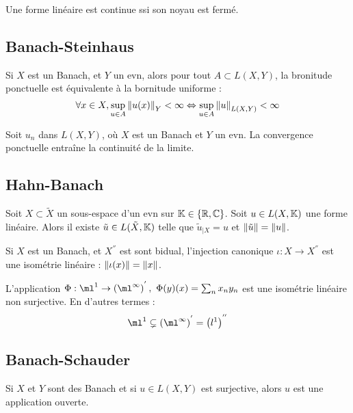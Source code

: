 \documentclass{cours}
\begin{document}
\begin{lemma}
    Une forme linéaire est continue ssi son noyau est fermé.
\end{lemma}

\subsection{Banach-Steinhaus}
\begin{theorem}\label{thm:BanachSteinhaus}
    Si $X$ est un Banach, et $Y$ un evn, alors pour tout $A \subset L(X, Y)$, la bronitude ponctuelle est équivalente à la bornitude uniforme : 
    \[
        \forall x \in X, \sup_{u \in A} \left\lVert u(x) \right\rVert_{Y} < \infty \Leftrightarrow \sup_{u\in A}\left\lVert u \right\rVert_{L(X, Y)} < \infty
    \]
\end{theorem}
\begin{corollary}
    Soit $u_{n}$ dans $L(X, Y)$, où $X$ est un Banach et $Y$ un evn. La convergence ponctuelle entraîne la continuité de la limite. 
\end{corollary}

\subsection{Hahn-Banach}
\begin{theorem}\label{thm:HahnBanach}
    Soit $X \subset \tilde{X}$ un sous-espace d'un evn sur $\mathbb{K} \in \left\{\mathbb{R}, \mathbb{C}\right\}$. Soit $u \in L(X, \mathbb{K})$ une forme linéaire. Alors il existe $\tilde{u} \in L(\tilde{X}, \mathbb{K})$ telle que $\tilde{u}_{\mid X} = u$ et $\left\lVert \tilde{u} \right\rVert = \left\lVert u \right\rVert$.
\end{theorem}

\begin{corollary}
    Si $X$ est un Banach, et $X^{''}$ est sont bidual, l'injection canonique $\iota : X \rightarrow X^{''}$ est une isométrie linéaire : $\left\lVert \iota(x) \right\rVert = \left\lVert x \right\rVert$.
\end{corollary}

\begin{corollary}
    L'application $\Phi : \ml^{1} \to \left(\ml^{\infty}\right)^{'}, \ \Phi(y)(x) = \sum_{n} x_{n}y_{n}$ est une isométrie linéaire non surjective. En d'autres termes :
    \[\ml^{1} \subsetneq \left(\ml^{\infty}\right)^{'} = \left(l^{1}\right)^{''}\]
\end{corollary}

\subsection{Banach-Schauder}
\begin{theorem}\label{thm:BanachSchauder}
    Si $X$ et $Y$ sont des Banach et si $u \in L(X, Y)$ est surjective, alors $u$ est une application ouverte.    
\end{theorem}
\end{document}
